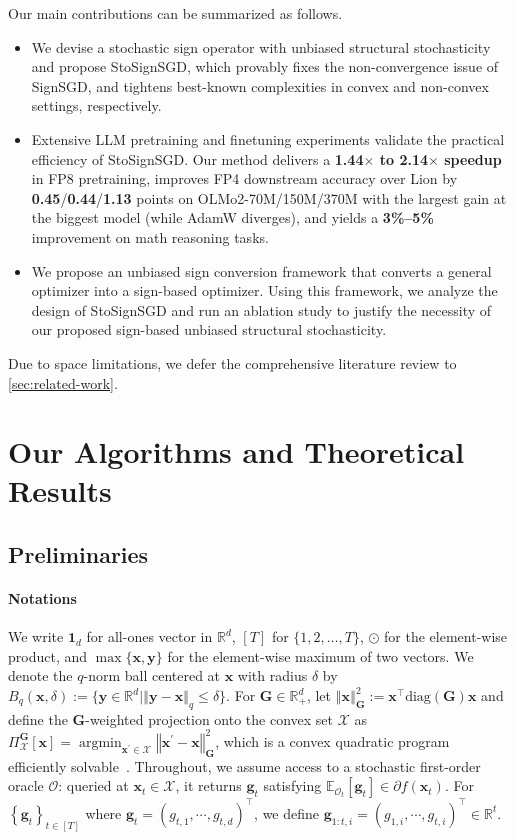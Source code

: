 \documentclass{article}
\def \y {\mathbf{y}}
\def \E {\mathbb{E}}
\def \x {\mathbf{x}}
\def \g {\mathbf{g}}
\def \O {\mathcal{O}}
\def \R {\mathbb{R}}
\def \Gb {\mathbf{G}}
\def \X {\mathcal{X}}
\DeclareMathOperator*{\argmin}{argmin}
\newcommand{\norm}[1]{\left\Vert#1\right\Vert}
\newcommand{\diag}[1]{\textrm{diag}\left(#1\right)}
\newcommand{\cbrac}[1]{\left\{#1\right\}}
\def\1{\bm{1}}
\begin{document}
Our main contributions can be summarized as follows.
\begin{itemize}[itemsep=0.00em, topsep=0.00em]
    \item We devise a stochastic sign operator with unbiased structural stochasticity and propose StoSignSGD, which provably fixes the non-convergence issue of SignSGD, and tightens best-known complexities in convex and non-convex settings, respectively. 
    \item Extensive LLM pretraining and finetuning experiments validate the practical efficiency of StoSignSGD. Our method delivers a \textbf{1.44$\times$ to 2.14$\times$ speedup} in FP8 pretraining, improves FP4 downstream accuracy over Lion by \textbf{0.45}/\textbf{0.44}/\textbf{1.13} points on OLMo2-70M/150M/370M with the largest gain at the biggest model (while AdamW diverges), and yields a \textbf{3\%--5\%} improvement on math reasoning tasks.
    \item We propose an unbiased sign conversion framework that converts a general optimizer into a sign-based optimizer. Using this framework, we analyze the design of StoSignSGD and run an ablation study to justify the necessity of our proposed sign-based unbiased structural stochasticity.
\end{itemize}
Due to space limitations, we defer the comprehensive literature review to \cref{sec:related-work}.

\section{Our Algorithms and Theoretical Results}

\subsection{Preliminaries} 

\paragraph{Notations} We write $\1_d$ for all-ones vector in $\R^d$, $[T]$ for $\{1,2,\dots,T\}$, $\odot$ for the element-wise product, and $\max\{\x,\y\}$ for the element-wise maximum of two vectors. We denote the $q$-norm ball centered at $\x$ with radius $\delta$ by $B_q(\x,\delta):=\{\y\in\R^d|\norm{\y-\x}_q\le\delta\}$. For $\Gb\in\R_{+}^{d}$, let $\norm{\x}_{\Gb}^{2}:=\x^{\top}\diag{\Gb}\x$ and define the $\Gb$-weighted projection onto the convex set $\X$ as $\Pi_\X^\Gb[\x]=\argmin_{\x^\prime\in\X}\norm{\x^\prime-\x}_\Gb^2$, which is a convex quadratic program efficiently solvable~\citep[\S~4]{hazan2007logarithmic}. Throughout, we assume access to a stochastic first-order oracle $\O$: queried at $\x_t\in\X$, it returns $\g_t$ satisfying $\E_{\O_t}[\g_t]\in\partial f(\x_t)$. For $\cbrac{\g_t}_{t\in[T]}$ where $\g_t=(g_{t,1},\cdots,g_{t,d})^\top$, we define $\g_{1:t,i}=(g_{1,i},\cdots,g_{t,i})^\top\in\R^t$.
\end{document}
